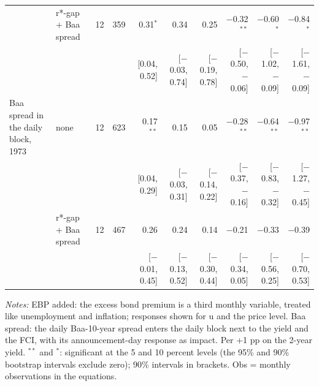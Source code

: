 \begin{table}[tp]
{\begin{tabular}{llcrrrrrrr}
 & r*-gap + Baa spread & 12 & 359 & 0.31$^{*}$ & 0.34 & 0.25 & $-$0.32$^{**}$ & $-$0.60$^{*}$ & $-$0.84$^{*}$\\
 & & & & {\scriptsize [0.04, 0.52]} & {\scriptsize [$-$0.03, 0.74]} & {\scriptsize [$-$0.19, 0.78]} & {\scriptsize [$-$0.50, $-$0.06]} & {\scriptsize [$-$1.02, $-$0.09]} & {\scriptsize [$-$1.61, $-$0.09]}\\
\addlinespace
Baa spread in the daily block, 1973 & none & 12 & 623 & 0.17$^{**}$ & 0.15 & 0.05 & $-$0.28$^{**}$ & $-$0.64$^{**}$ & $-$0.97$^{**}$\\
 & & & & {\scriptsize [0.04, 0.29]} & {\scriptsize [$-$0.03, 0.31]} & {\scriptsize [$-$0.14, 0.22]} & {\scriptsize [$-$0.37, $-$0.16]} & {\scriptsize [$-$0.83, $-$0.32]} & {\scriptsize [$-$1.27, $-$0.45]}\\
 & r*-gap + Baa spread & 12 & 467 & 0.26 & 0.24 & 0.14 & $-$0.21 & $-$0.33 & $-$0.39\\
 & & & & {\scriptsize [$-$0.01, 0.45]} & {\scriptsize [$-$0.13, 0.52]} & {\scriptsize [$-$0.30, 0.44]} & {\scriptsize [$-$0.34, 0.05]} & {\scriptsize [$-$0.56, 0.25]} & {\scriptsize [$-$0.70, 0.53]}\\
\bottomrule\end{tabular}}
\begin{flushleft}\footnotesize\textit{Notes:} EBP added: the excess bond premium is a third monthly variable, treated like unemployment and inflation; responses shown for u and the price level. Baa spread: the daily Baa-10-year spread enters the daily block next to the yield and the FCI, with its announcement-day response as impact. Per +1 pp on the 2-year yield. $^{**}$ and $^{*}$: significant at the 5 and 10 percent levels (the 95\% and 90\% bootstrap intervals exclude zero); 90\% intervals in brackets. Obs = monthly observations in the equations.\end{flushleft}
\end{table}
